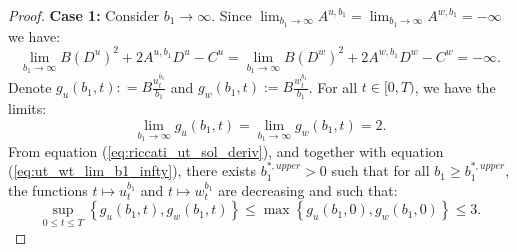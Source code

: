 \documentclass[11pt]{article}
\begin{document}
\begin{proof}
	\textbf{Case 1:} Consider $b_1 \to \infty$. Since $\lim_{b_1 \to \infty} A^{u,b_1} = \lim_{b_1 \to \infty} A^{w,b_1} = - \infty$ we have:
	$$\lim_{b_1 \to \infty}B (D^{u})^2 + 2 A^{u,b_1} D^{u} - C^{u} = \lim_{b_1 \to \infty}B (D^{w})^2 + 2 A^{w,b_1} D^{w} - C^{w}=-\infty.$$
	Denote $g_u(b_1,t): = B \frac{u_t^{b_1}}{b_1}$ and $g_w(b_1,t) := B \frac{w_t^{b_1}}{b_1}$. For all $t \in [0,T)$, we have the limits:
	\begin{equation}
		\lim_{b_1 \to \infty} g_u(b_1,t) =  \lim_{b_1 \to \infty} g_w(b_1,t) = 2.
	\label{eq:ut_wt_lim_b1_infty}
	\end{equation}
	From equation (\ref{eq:riccati_ut_sol_deriv}), and together with equation (\ref{eq:ut_wt_lim_b1_infty}), there exists $b_1^{*,upper} >0$ such that for all $b_1 \geq b_1^{*,upper}$, the functions $t \mapsto u_t^{b_1}$ and $t \mapsto w_t^{b_1}$ are decreasing and such that:
	$$ \sup_{0 \leq t \leq T} \left\{ g_u(b_1, t), g_w(b_1,t)\right\} \leq \max \left\{ g_u(b_1, 0), g_w(b_1,0) \right\} \leq 3.$$
	

\end{proof}
\end{document}
